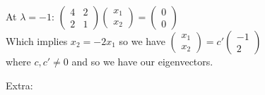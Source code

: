 \documentclass[10pt]{article}
\begin{document}
\begin{multicols}{2}
\begin{itemize}
    At $\lambda=-1$: $\begin{pmatrix}4&2\\2&1\end{pmatrix}\begin{pmatrix}x_{1}\\x_{2}\end{pmatrix}=\begin{pmatrix}0\\0\end{pmatrix}$\\
    Which implies $x_{2}=-2x_{1}$ so we have $\begin{pmatrix}x_{1}\\x_{2}\end{pmatrix}=c'\begin{pmatrix}-1\\2\end{pmatrix}$\\
    where $c,c'\neq0$ and so we have our eigenvectors.
\end{itemize} 
\end{multicols}
Extra:
\end{document}
